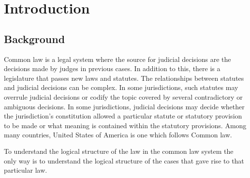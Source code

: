 \setlength{\footskip}{8mm}

\chapter{Introduction}

\section{Background}

Common law is a legal system where the source for judicial decisions are the decisions made by judges in previous cases. In addition to this, there is a legislature that passes new laws and statutes. The relationships between statutes and judicial decisions can be complex. In some jurisdictions, such statutes may overrule judicial decisions or codify the topic covered by several contradictory or ambiguous decisions. In some jurisdictions, judicial decisions may decide whether the jurisdiction's constitution allowed a particular statute or statutory provision to be made or what meaning is contained within the statutory provisions.
Among many countries, United States of America is one which follows Common law.


To understand the logical structure of the law in the common law system the only way is to understand the logical structure of the cases that gave rise to that particular law.

